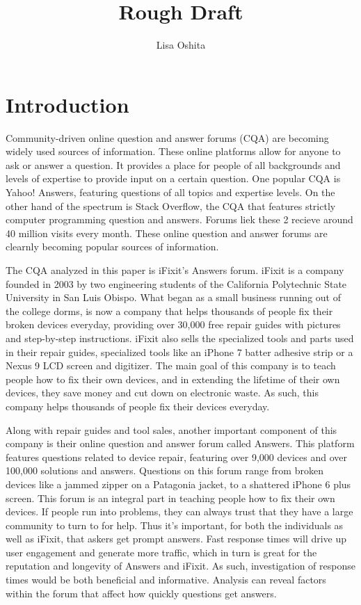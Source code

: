 \documentclass[12pt]{article}
\title{Rough Draft}
\author{Lisa Oshita}
\date{}
\begin{document}
\maketitle

\section{Introduction}

    Community-driven online question and answer forums (CQA) are becoming widely used sources of information. These online platforms allow for anyone to ask or answer a question. It provides a place for people of all backgrounds and levels of expertise to provide input on a certain question. One popular CQA is Yahoo! Answers, featuring questions of all topics and expertise levels. On the other hand of the spectrum is Stack Overflow, the CQA that features strictly computer programming question and answers. Forums liek these 2 recieve around 40 million visits every month. These online question and answer forums are clearnly becoming popular sources of information. 
    
    The CQA analyzed in this paper is iFixit's Answers forum. iFixit is a company founded in 2003 by two engineering students of the California Polytechnic State University in San Luis Obispo. What began as a small business running out of the college dorms, is now a company that helps thousands of people fix their broken devices everyday, providing over 30,000 free repair guides with pictures and step-by-step instructions. iFixit also sells the specialized tools and parts used in their repair guides, specialized tools like an iPhone 7 batter adhesive strip or a Nexus 9 LCD screen and digitizer. The main goal of this company is to teach people how to fix their own devices, and in extending the lifetime of their own devices, they save money and cut down on electronic waste. As such, this company helps thousands of people fix their devices everyday. 
    
    Along with repair guides and tool sales, another important component of this company is their online question and answer forum called Answers. This platform features questions related to device repair, featuring over 9,000 devices and over 100,000 solutions and answers. Questions on this forum range from broken devices like a jammed zipper on a Patagonia jacket, to a shattered iPhone 6 plus screen. This forum is an integral part in teaching people how to fix their own devices. If people run into problems, they can always trust that they have a large community to turn to for help. Thus it's important, for both the individuals as well as iFixit, that askers get prompt answers. Fast response times will drive up user engagement and generate more traffic, which in turn is great for the reputation and longevity of Answers and iFixit. As such, investigation of response times would be both beneficial and informative. Analysis can reveal factors within the forum that affect how quickly questions get answers. 
\end{document}
